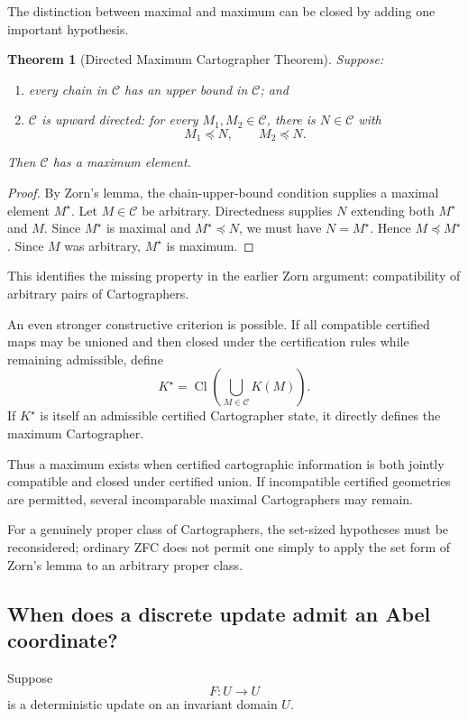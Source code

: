 \documentclass[11pt]{article}
\newtheorem{theorem}{Theorem}[section]
\newcommand{\Cl}{\operatorname{Cl}}
\begin{document}
The distinction between maximal and maximum can be closed by adding one important hypothesis.

\begin{theorem}[Directed Maximum Cartographer Theorem]
Suppose:
\begin{enumerate}[label=(\arabic*)]
\item every chain in $\mathcal C$ has an upper bound in $\mathcal C$; and
\item $\mathcal C$ is upward directed: for every $M_1,M_2\in\mathcal C$, there is $N\in\mathcal C$ with
\[
M_1\preceq N,\qquad M_2\preceq N.
\]
\end{enumerate}
Then $\mathcal C$ has a maximum element.
\end{theorem}

\begin{proof}
By Zorn's lemma, the chain-upper-bound condition supplies a maximal element $M^\star$. Let $M\in\mathcal C$ be arbitrary. Directedness supplies $N$ extending both $M^\star$ and $M$. Since $M^\star$ is maximal and $M^\star\preceq N$, we must have $N=M^\star$. Hence $M\preceq M^\star$. Since $M$ was arbitrary, $M^\star$ is maximum.
\end{proof}

This identifies the missing property in the earlier Zorn argument: compatibility of arbitrary pairs of Cartographers.

An even stronger constructive criterion is possible. If all compatible certified maps may be unioned and then closed under the certification rules while remaining admissible, define
\[
K^\star=\Cl\left(\bigcup_{M\in\mathcal C}K(M)\right).
\]
If $K^\star$ is itself an admissible certified Cartographer state, it directly defines the maximum Cartographer.

Thus a maximum exists when certified cartographic information is both jointly compatible and closed under certified union. If incompatible certified geometries are permitted, several incomparable maximal Cartographers may remain.

For a genuinely proper class of Cartographers, the set-sized hypotheses must be reconsidered; ordinary ZFC does not permit one simply to apply the set form of Zorn's lemma to an arbitrary proper class.

\subsection{When does a discrete update admit an Abel coordinate?}
Suppose
\[
F:U\to U
\]
is a deterministic update on an invariant domain $U$.
\end{document}
